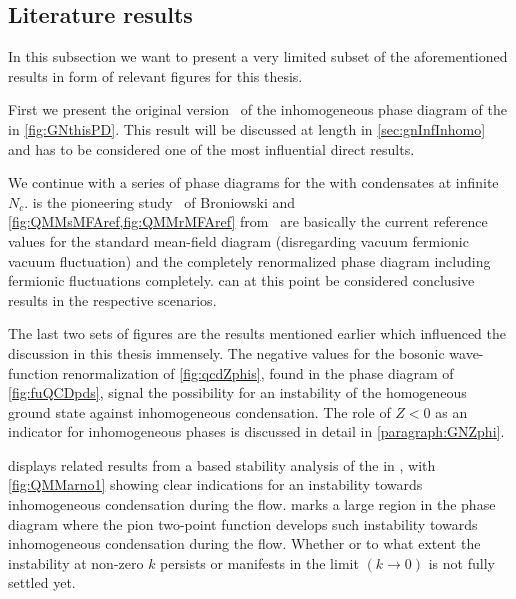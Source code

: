 \FloatBarrier
\subsection{Literature results}\label{subsec:inhomoLiterature}
In this subsection we want to present a very limited subset of the aforementioned results in form of relevant figures for this thesis.\bigskip

First we present the original version~\cite{Thies:2003kk} of the inhomogeneous phase diagram of the \gnm{} in \cref{fig:GNthisPD}. This result will be discussed at length in \cref{sec:gnInfInhomo} and has to be considered one of the most influential direct results.

We continue with a series of phase diagrams for the \qmm{} with \cdw{} condensates at infinite $N_c$.
 is the pioneering study~\cite{Broniowski:1990dy} of Broniowski \etal{} and \cref{fig:QMMsMFAref,fig:QMMrMFAref} from~\cite{Adhikari:2017ydi} are basically the current reference values for the standard mean-field diagram (disregarding vacuum fermionic vacuum fluctuation) and the completely renormalized \qmm{} phase diagram including fermionic fluctuations completely.
 can at this point be considered conclusive results in the respective scenarios.

The last two sets of figures are the \frg{} results mentioned earlier which influenced the discussion in this thesis immensely.
The negative values for the bosonic wave-function renormalization of \cref{fig:qcdZphis}, found in the phase diagram of \qcd{} \cref{fig:fuQCDpds}, signal the possibility for an instability of the homogeneous ground state against inhomogeneous condensation. The role of $Z<0$ as an indicator for inhomogeneous phases is discussed in detail in \cref{paragraph:GNZphi}.

 displays related results from a \frg{} based stability analysis of the \qmm{} in \lpa{}, with \cref{fig:QMMarno1} showing clear indications for an instability towards inhomogeneous condensation during the \frg{} flow.
 marks a large region in the phase diagram where the pion two-point function develops such instability towards inhomogeneous condensation during the \frg{} flow.
Whether or to what extent the instability at non-zero $k$ persists or manifests in the \ir{} limit ${(k\rightarrow 0)}$ is not fully settled yet.

